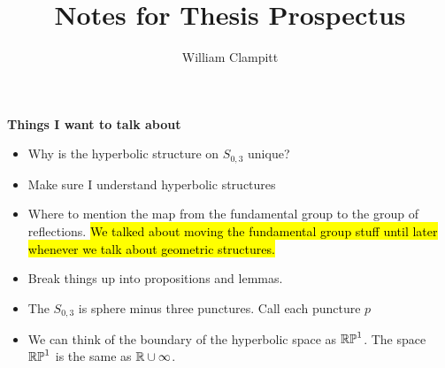 \documentclass{amsart}
\title{Notes for Thesis Prospectus}
\author{William Clampitt}
\begin{document}
	\maketitle
	
	\begin{tcolorbox}[colback=myblue]
		\textbf{\centering Things I want to talk about}
		\begin{itemize}
			\item Why is the hyperbolic structure on $S_{0,3}$ unique?
			\item Make sure I understand hyperbolic structures
			\item Where to mention the map from the fundamental group to the group of reflections. \hl{We talked about moving the fundamental group stuff until later whenever we talk about geometric structures.}
			\item Break things up into propositions and lemmas.
			\item The $S_{0,3}$ is sphere minus three punctures. Call each puncture $p_{}$
			\item We can think of the boundary of the hyperbolic space as $\mathbb{RP}^1$. The space $\mathbb{RP}^1$ is the same as $\mathbb{R} \cup \infty$.
		\end{itemize}
	\end{tcolorbox}
\end{document}
